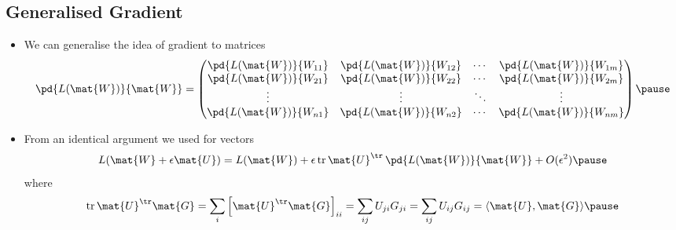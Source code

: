 \begin{slide}
\section[-2]{Generalised Gradient}

\begin{PauseHighLight}
  \begin{itemize}
  \item We can generalise the idea of gradient to matrices
    \begin{align*}
      \pd{L(\mat{W})}{\mat{W}} =
      \begin{pmatrix}
        \pd{L(\mat{W})}{W_{11}} & \pd{L(\mat{W})}{W_{12}} & \cdots & \pd{L(\mat{W})}{W_{1m}} \\ 
        \pd{L(\mat{W})}{W_{21}} & \pd{L(\mat{W})}{W_{22}} & \cdots & \pd{L(\mat{W})}{W_{2m}} \\ 
        \vdots & \vdots & \ddots & \vdots \\
        \pd{L(\mat{W})}{W_{n1}} & \pd{L(\mat{W})}{W_{n2}} & \cdots & \pd{L(\mat{W})}{W_{nm}} \\ 
      \end{pmatrix}\pause
    \end{align*}
  \item From an identical argument we used for vectors
    \begin{align*}
      L(\mat{W}+\epsilon \mat{U}) = L(\mat{W}) + \epsilon\,
      \mathrm{tr}\,  \mat{U}^\tr \,  \pd{L(\mat{W})}{\mat{W}} + O(\epsilon^2)\pause
    \end{align*}
    where
    \begin{align*}
      \mathrm{tr}\, \mat{U}^\tr  \mat{G} = \sum_{i} \left[   \mat{U}^\tr
      \mat{G}\right]_{ii} = \sum_{ij} U_{ji} G_{ji} = \sum_{ij} U_{ij} G_{ij} = \langle \mat{U},
      \mat{G} \rangle\pause
    \end{align*}
  \end{itemize}
\end{PauseHighLight}

\end{slide}


